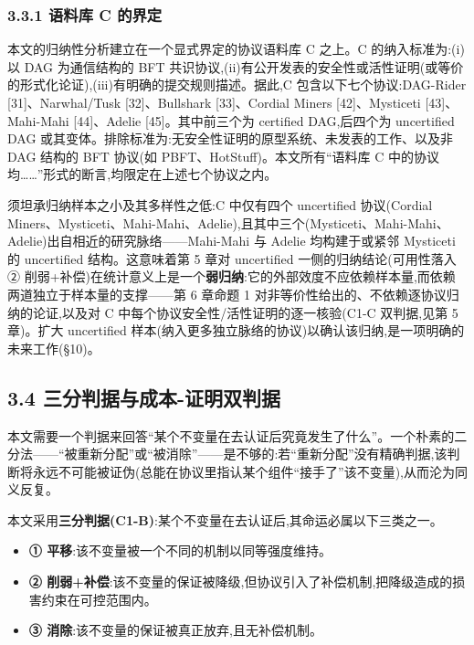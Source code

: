 \documentclass[UTF8,fontset=windows,a4paper,11pt]{ctexart}
\providecommand{\tightlist}{\setlength{\itemsep}{0pt}\setlength{\parskip}{0pt}}
\begin{document}
\subsubsection{3.3.1 语料库 C 的界定}\label{ux8bedux6599ux5e93-c-ux7684ux754cux5b9a}

本文的归纳性分析建立在一个显式界定的协议语料库 C 之上。C 的纳入标准为:(i)以 DAG 为通信结构的 BFT 共识协议,(ii)有公开发表的安全性或活性证明(或等价的形式化论证),(iii)有明确的提交规则描述。据此,C 包含以下七个协议:DAG-Rider {[}31{]}、Narwhal/Tusk {[}32{]}、Bullshark {[}33{]}、Cordial Miners {[}42{]}、Mysticeti {[}43{]}、Mahi-Mahi {[}44{]}、Adelie {[}45{]}。其中前三个为 certified DAG,后四个为 uncertified DAG 或其变体。排除标准为:无安全性证明的原型系统、未发表的工作、以及非 DAG 结构的 BFT 协议(如 PBFT、HotStuff)。本文所有``语料库 C 中的协议均\ldots\ldots''形式的断言,均限定在上述七个协议之内。

须坦承归纳样本之小及其多样性之低:C 中仅有四个 uncertified
协议(Cordial Miners、Mysticeti、Mahi-Mahi、Adelie),且其中三个(Mysticeti、Mahi-Mahi、Adelie)出自相近的研究脉络------Mahi-Mahi
与 Adelie 均构建于或紧邻 Mysticeti 的 uncertified
结构。这意味着第 5 章对 uncertified 一侧的归纳结论(可用性落入 ②
削弱+补偿)在统计意义上是一个\textbf{弱归纳}:它的外部效度不应依赖样本量,而依赖两道独立于样本量的支撑------第
6 章命题 1 对非等价性给出的、不依赖逐协议归纳的论证,以及对 C
中每个协议安全性/活性证明的逐一核验(C1-C
双判据,见第 5 章)。扩大 uncertified 样本(纳入更多独立脉络的协议)以确认该归纳,是一项明确的未来工作(§10)。

\subsection{3.4
三分判据与成本-证明双判据}\label{ux4e09ux5206ux5224ux636eux4e0eux6210ux672c-ux8bc1ux660eux53ccux5224ux636e}

本文需要一个判据来回答``某个不变量在去认证后究竟发生了什么''。一个朴素的二分法------``被重新分配''或``被消除''------是不够的:若``重新分配''没有精确判据,该判断将永远不可能被证伪(总能在协议里指认某个组件``接手了''该不变量),从而沦为同义反复。

本文采用\textbf{三分判据(C1-B)}:某个不变量在去认证后,其命运必属以下三类之一。

\begin{itemize}
\tightlist
\item
  \textbf{① 平移}:该不变量被一个不同的机制以同等强度维持。
\item
  \textbf{②
  削弱+补偿}:该不变量的保证被降级,但协议引入了补偿机制,把降级造成的损害约束在可控范围内。
\item
  \textbf{③ 消除}:该不变量的保证被真正放弃,且无补偿机制。
\end{itemize}
\end{document}
